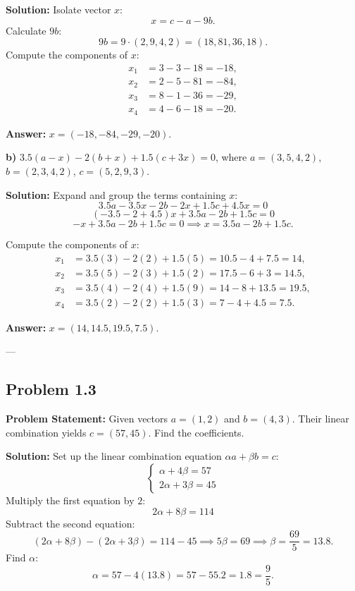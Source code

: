 \documentclass[11pt, a4paper]{article}
\begin{document}
\textbf{Solution:}
Isolate vector $x$:
$$ x = c - a - 9b. $$
Calculate $9b$:
$$ 9b = 9 \cdot (2, 9, 4, 2) = (18, 81, 36, 18). $$
Compute the components of $x$:
\begin{align*}
x_1 &= 3 - 3 - 18 = -18, \\
x_2 &= 2 - 5 - 81 = -84, \\
x_3 &= 8 - 1 - 36 = -29, \\
x_4 &= 4 - 6 - 18 = -20.
\end{align*}

\textbf{Answer:} $x = (-18, -84, -29, -20)$.

\medskip
\textbf{b)} $3.5(a - x) - 2(b + x) + 1.5(c + 3x) = 0$, where $a = (3, 5, 4, 2)$, $b = (2, 3, 4, 2)$, $c = (5, 2, 9, 3)$.

\textbf{Solution:}
Expand and group the terms containing $x$:
$$ 3.5a - 3.5x - 2b - 2x + 1.5c + 4.5x = 0 $$
$$ (-3.5 - 2 + 4.5)x + 3.5a - 2b + 1.5c = 0 $$
$$ -x + 3.5a - 2b + 1.5c = 0 \implies x = 3.5a - 2b + 1.5c. $$

Compute the components of $x$:
\begin{align*}
x_1 &= 3.5(3) - 2(2) + 1.5(5) = 10.5 - 4 + 7.5 = 14, \\
x_2 &= 3.5(5) - 2(3) + 1.5(2) = 17.5 - 6 + 3 = 14.5, \\
x_3 &= 3.5(4) - 2(4) + 1.5(9) = 14 - 8 + 13.5 = 19.5, \\
x_4 &= 3.5(2) - 2(2) + 1.5(3) = 7 - 4 + 4.5 = 7.5.
\end{align*}

\textbf{Answer:} $x = (14, 14.5, 19.5, 7.5)$.

---

\subsection*{Problem 1.3}
\textbf{Problem Statement:} Given vectors $a=(1,2)$ and $b=(4,3)$. Their linear combination yields $c=(57,45)$. Find the coefficients.

\textbf{Solution:}
Set up the linear combination equation $\alpha a + \beta b = c$:
$$ \begin{cases} \alpha + 4\beta = 57 \\ 2\alpha + 3\beta = 45 \end{cases} $$
Multiply the first equation by $2$:
$$ 2\alpha + 8\beta = 114 $$
Subtract the second equation:
$$ (2\alpha + 8\beta) - (2\alpha + 3\beta) = 114 - 45 \implies 5\beta = 69 \implies \beta = \frac{69}{5} = 13.8. $$
Find $\alpha$:
$$ \alpha = 57 - 4(13.8) = 57 - 55.2 = 1.8 = \frac{9}{5}. $$
\end{document}
